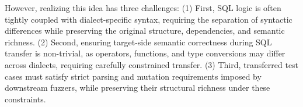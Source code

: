 \documentclass[conference]{IEEEtran}
\begin{document}


However, realizing this idea has three challenges:
(1) First, SQL logic is often tightly coupled with dialect-specific syntax, requiring the separation of syntactic differences while preserving the original structure, dependencies, and semantic richness.
(2) Second, ensuring target-side semantic correctness during SQL transfer is non-trivial, as operators, functions, and type conversions may differ across dialects, requiring carefully constrained transfer.
(3) Third, transferred test cases must satisfy strict parsing and mutation requirements imposed by downstream fuzzers, while preserving their structural richness under these constraints.



\end{document}
